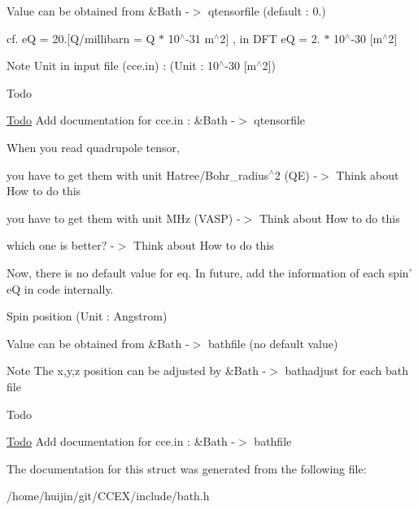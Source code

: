 Value can be obtained from \&Bath -\/$>$ qtensorfile (default \-: 0.)
\begin{DoxyItemize}
\item cf. e\-Q = 20.\mbox{[}Q/millibarn = Q $\ast$ 10$^\wedge$-\/31 m$^\wedge$2\mbox{]} , in D\-F\-T e\-Q = 2. $\ast$ 10$^\wedge$-\/30 \mbox{[}m$^\wedge$2\mbox{]} \begin{DoxyNote}{Note}
Unit in input file (cce.\-in) \-: (Unit \-: 10$^\wedge$-\/30 \mbox{[}m$^\wedge$2\mbox{]}) 
\end{DoxyNote}
\begin{DoxyRefDesc}{Todo}
\item[\hyperlink{todo__todo000003}{Todo}]Add documentation for cce.\-in \-: \&Bath -\/$>$ qtensorfile 

When you read quadrupole tensor,
\begin{DoxyItemize}
\item you have to get them with unit Hatree/\-Bohr\-\_\-radius$^\wedge$2 (Q\-E) -\/$>$ Think about How to do this
\item you have to get them with unit M\-Hz (V\-A\-S\-P) -\/$>$ Think about How to do this
\item which one is better? -\/$>$ Think about How to do this 
\end{DoxyItemize}

Now, there is no default value for eq. In future, add the information of each spin' e\-Q in code internally. \end{DoxyRefDesc}
Spin position (Unit \-: Angstrom)
\end{DoxyItemize}

Value can be obtained from \&Bath -\/$>$ bathfile (no default value) \begin{DoxyNote}{Note}
The x,y,z position can be adjusted by \&Bath -\/$>$ bathadjust for each bath file 
\end{DoxyNote}
\begin{DoxyRefDesc}{Todo}
\item[\hyperlink{todo__todo000004}{Todo}]Add documentation for cce.\-in \-: \&Bath -\/$>$ bathfile \end{DoxyRefDesc}


The documentation for this struct was generated from the following file\-:\begin{DoxyCompactItemize}
\item 
/home/huijin/git/\-C\-C\-E\-X/include/bath.\-h\end{DoxyCompactItemize}
